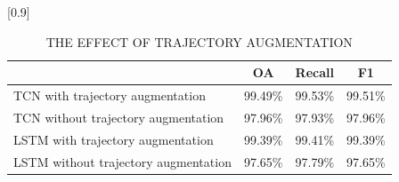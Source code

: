 \begin{table}[b]
  \begin{center}
    \caption{{THE EFFECT OF TRAJECTORY AUGMENTATION\cite{Temporal convolutional networks for multi-person activity recognition using a 2D LIDAR}}
    \label{2-2_THE EFFECT OF TRAJECTORY AUGMENTATION}}
    \scalebox{1.0}[0.9]{
      \begin{tabular}{l|c|c|c} \hline
        & OA & Recall & F1 \\ \hline
        TCN with trajectory augmentation & 99.49\% & 99.53\% & 99.51\% \\ \hline
        TCN without trajectory augmentation & 97.96\% & 97.93\% & 97.96\% \\ \hline
        LSTM with trajectory augmentation & 99.39\% & 99.41\% & 99.39\% \\ \hline
        LSTM without trajectory augmentation & 97.65\% & 97.79\% & 97.65\% \\ \hline
      \end{tabular}
    }
  \end{center}
\end{table}